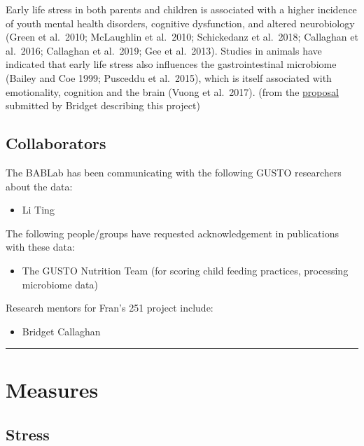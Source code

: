 \documentclass[
]{book}
\providecommand{\tightlist}{%
  \setlength{\itemsep}{0pt}\setlength{\parskip}{0pt}}
\begin{document}
Early life stress in both parents and children is associated with a higher incidence of youth mental health disorders, cognitive dysfunction, and altered neurobiology (Green et al.~2010; McLaughlin et al.~2010; Schickedanz et al.~2018; Callaghan et al.~2016; Callaghan et al.~2019; Gee et al.~2013). Studies in animals have indicated that early life stress also influences the gastrointestinal microbiome (Bailey and Coe 1999; Pusceddu et al.~2015), which is itself associated with emotionality, cognition and the brain (Vuong et al.~2017). (from the \href{https://ucla.app.box.com/file/740587024475}{proposal} submitted by Bridget describing this project)

\hypertarget{collaborators}{%
\subsection{Collaborators}\label{collaborators}}

The BABLab has been communicating with the following GUSTO researchers about the data:

\begin{itemize}
\tightlist
\item
  Li Ting
\end{itemize}

The following people/groups have requested acknowledgement in publications with these data:

\begin{itemize}
\tightlist
\item
  The GUSTO Nutrition Team (for scoring child feeding practices, processing microbiome data)
\end{itemize}

Research mentors for Fran's 251 project include:

\begin{itemize}
\tightlist
\item
  Bridget Callaghan
\end{itemize}

\begin{center}\rule{0.5\linewidth}{0.5pt}\end{center}

\hypertarget{measures}{%
\section{Measures}\label{measures}}

\hypertarget{stress}{%
\subsection{Stress}\label{stress}}
\end{document}
